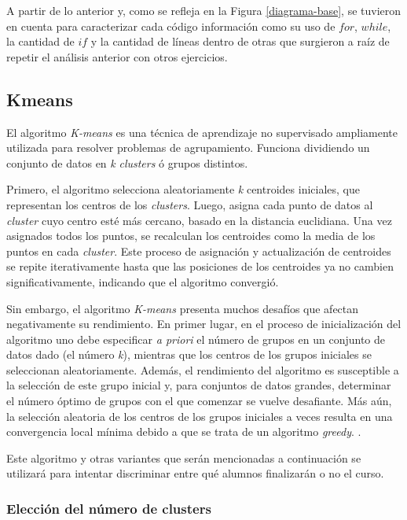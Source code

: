 \documentclass[11pt,a4paper,twoside,openany]{tesis}
\begin{document}
A partir de lo anterior y, como se refleja en la Figura \ref{diagrama-base}, se tuvieron en cuenta para caracterizar cada código información como su uso de $for$, $while$, la cantidad de $if$ y la cantidad de líneas dentro de otras que surgieron a raíz de repetir el análisis anterior con otros ejercicios.

\subsection{Kmeans}

El algoritmo \emph{K-means} es una técnica de aprendizaje no supervisado ampliamente utilizada para resolver problemas de agrupamiento. Funciona dividiendo un conjunto de datos en \emph{k} \emph{clusters} ó grupos distintos. 

Primero, el algoritmo selecciona aleatoriamente \emph{k} centroides iniciales, que representan los centros de los \emph{clusters}. Luego, asigna cada punto de datos al \emph{cluster} cuyo centro esté más cercano, basado en la distancia euclidiana. Una vez asignados todos los puntos, se recalculan los centroides como la media de los puntos en cada \emph{cluster}. Este proceso de asignación y actualización de centroides se repite iterativamente hasta que las posiciones de los centroides ya no cambien significativamente, indicando que el algoritmo convergió. \cite{kmeans}

Sin embargo, el algoritmo \emph{K-means} presenta muchos desafíos que afectan negativamente su rendimiento. En primer lugar, en el proceso de inicialización del algoritmo uno debe especificar \emph{a priori} el número de grupos en un conjunto de datos dado (el número \emph{k}), mientras que los centros de los grupos iniciales se seleccionan aleatoriamente. Además, el rendimiento del algoritmo es susceptible a la selección de este grupo inicial y, para conjuntos de datos grandes, determinar el número óptimo de grupos con el que comenzar se vuelve desafiante. Más aún, la selección aleatoria de los centros de los grupos iniciales a veces resulta en una convergencia local mínima debido a que se trata de un algoritmo \emph{greedy}. \cite{kmeans-limitaciones}.

Este algoritmo y otras variantes que serán mencionadas a continuación se utilizará para intentar discriminar entre qué alumnos finalizarán o no el curso. 

\subsubsection{Elección del número de clusters} \textbf{ } 
\end{document}
